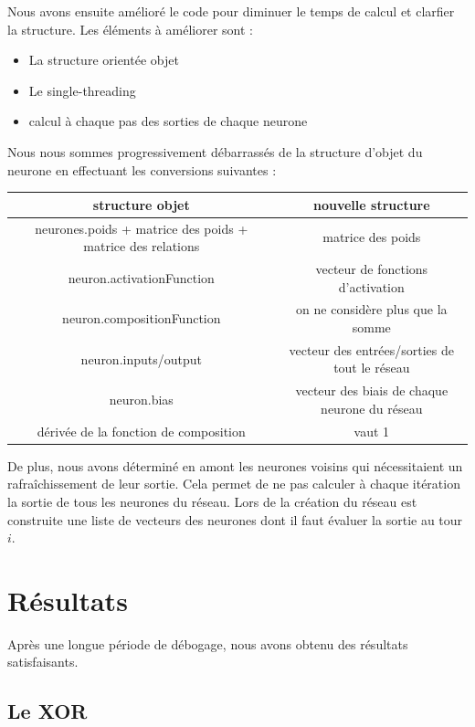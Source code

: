 Nous avons ensuite amélioré le code pour diminuer le temps de calcul et clarfier
la structure. Les éléments à améliorer sont :
\begin{itemize}
\item La structure orientée objet
\item Le single-threading
\item calcul à chaque pas des sorties de chaque neurone
\end{itemize}

\medskip

Nous nous sommes progressivement débarrassés de la structure d'objet du neurone
en effectuant les conversions suivantes :

\medskip

\begin{tabular}{c|c}
   structure objet & nouvelle structure \\
   \hline
   neurones.poids + matrice des poids + matrice des relations & matrice des poids \\
   neuron.activationFunction & vecteur de fonctions d'activation \\
   neuron.compositionFunction & on ne considère plus que la somme \\
   neuron.inputs/output & vecteur des entrées/sorties de tout le réseau \\
   neuron.bias & vecteur des biais de chaque neurone du réseau \\
   dérivée de la fonction de composition & vaut 1
\end{tabular}

\medskip

De plus, nous avons déterminé en amont les neurones voisins qui nécessitaient
un rafraîchissement de leur sortie. Cela permet de ne pas calculer à chaque
itération la sortie de tous les neurones du réseau. Lors de la création du
réseau est construite une liste de vecteurs des neurones dont il faut évaluer
la sortie au tour $i$.

\section{Résultats}

Après une longue période de débogage, nous avons obtenu des résultats
satisfaisants.


\subsection{Le XOR}

